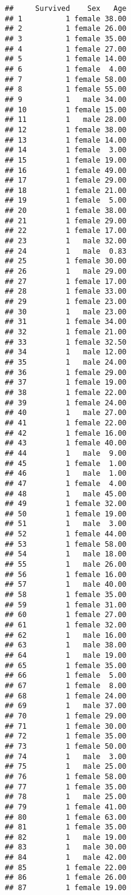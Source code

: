 \documentclass[
]{article}
\begin{document}
\begin{verbatim}
##     Survived    Sex   Age
## 1          1 female 38.00
## 2          1 female 26.00
## 3          1 female 35.00
## 4          1 female 27.00
## 5          1 female 14.00
## 6          1 female  4.00
## 7          1 female 58.00
## 8          1 female 55.00
## 9          1   male 34.00
## 10         1 female 15.00
## 11         1   male 28.00
## 12         1 female 38.00
## 13         1 female 14.00
## 14         1 female  3.00
## 15         1 female 19.00
## 16         1 female 49.00
## 17         1 female 29.00
## 18         1 female 21.00
## 19         1 female  5.00
## 20         1 female 38.00
## 21         1 female 29.00
## 22         1 female 17.00
## 23         1   male 32.00
## 24         1   male  0.83
## 25         1 female 30.00
## 26         1   male 29.00
## 27         1 female 17.00
## 28         1 female 33.00
## 29         1 female 23.00
## 30         1   male 23.00
## 31         1 female 34.00
## 32         1 female 21.00
## 33         1 female 32.50
## 34         1   male 12.00
## 35         1   male 24.00
## 36         1 female 29.00
## 37         1 female 19.00
## 38         1 female 22.00
## 39         1 female 24.00
## 40         1   male 27.00
## 41         1 female 22.00
## 42         1 female 16.00
## 43         1 female 40.00
## 44         1   male  9.00
## 45         1 female  1.00
## 46         1   male  1.00
## 47         1 female  4.00
## 48         1   male 45.00
## 49         1 female 32.00
## 50         1 female 19.00
## 51         1   male  3.00
## 52         1 female 44.00
## 53         1 female 58.00
## 54         1   male 18.00
## 55         1   male 26.00
## 56         1 female 16.00
## 57         1   male 40.00
## 58         1 female 35.00
## 59         1 female 31.00
## 60         1 female 27.00
## 61         1 female 32.00
## 62         1   male 16.00
## 63         1   male 38.00
## 64         1   male 19.00
## 65         1 female 35.00
## 66         1 female  5.00
## 67         1 female  8.00
## 68         1 female 24.00
## 69         1   male 37.00
## 70         1 female 29.00
## 71         1 female 30.00
## 72         1 female 35.00
## 73         1 female 50.00
## 74         1   male  3.00
## 75         1   male 25.00
## 76         1 female 58.00
## 77         1 female 35.00
## 78         1   male 25.00
## 79         1 female 41.00
## 80         1 female 63.00
## 81         1 female 35.00
## 82         1   male 19.00
## 83         1   male 30.00
## 84         1   male 42.00
## 85         1 female 22.00
## 86         1 female 26.00
## 87         1 female 19.00

\end{verbatim}
\end{document}
